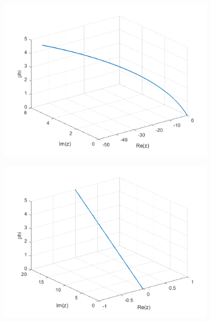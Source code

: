 \documentclass[a4paper,11pt]{article}
\begin{document}
\begin{figure}[!h]
\begin{subfigure}[c]{0.3\textwidth}
\end{subfigure}
\begin{subfigure}[c]{0.3\textwidth}
\includegraphics[width=\linewidth]{plot6_musg22.png}
\end{subfigure}
\begin{subfigure}[c]{0.3\textwidth}
\includegraphics[width=\linewidth]{plot6_musg30.png}
\end{subfigure}
\begin{subfigure}[c]{0.3\textwidth}

\end{subfigure}
\end{figure}
\end{document}
